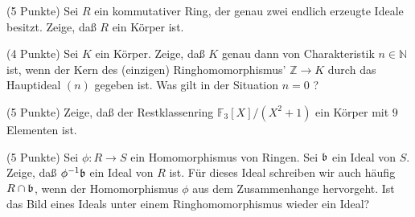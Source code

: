 \documentclass{algsheet}
\begin{document}
\begin{exercise}(5 Punkte)\newline
    Sei \(R\) ein kommutativer Ring, der genau zwei endlich erzeugte Ideale
    besitzt. Zeige, daß \(R\) ein Körper ist.
\end{exercise}


\begin{exercise}(4 Punkte)\newline
    Sei \(K\) ein Körper. Zeige, daß \(K\) genau dann von Charakteristik \(n \in \mathbb N\)
    ist, wenn der Kern des (einzigen) Ringhomomorphismus' \(\mathbb Z \to K\) durch
    das Hauptideal \((n)\) gegeben ist.
 \newline
    Was gilt in der Situation $n = 0$ ?
\end{exercise}

\begin{exercise}(5 Punkte)\newline
    Zeige, daß der Restklassenring \(\mathbb F_3[X]/(X^2 + 1)\) ein Körper mit
    \(9\) Elementen ist.
\end{exercise}



\begin{exercise}(5 Punkte)\newline
    Sei \(\phi\colon R \to S\) ein Homomorphismus von Ringen. Sei \(\mathfrak{b}\)
    ein Ideal von \(S\). Zeige, daß \(\phi^{-1} \mathfrak{b}\) ein Ideal von \(R\)
    ist. Für dieses Ideal schreiben wir auch häufig \(R \cap \mathfrak{b}\), wenn
    der Homomorphismus \(\phi\) aus dem Zusammenhange hervorgeht.
   \newline
   Ist das Bild eines Ideals unter einem Ringhomomorphismus wieder ein Ideal?
\end{exercise}
\end{document}

